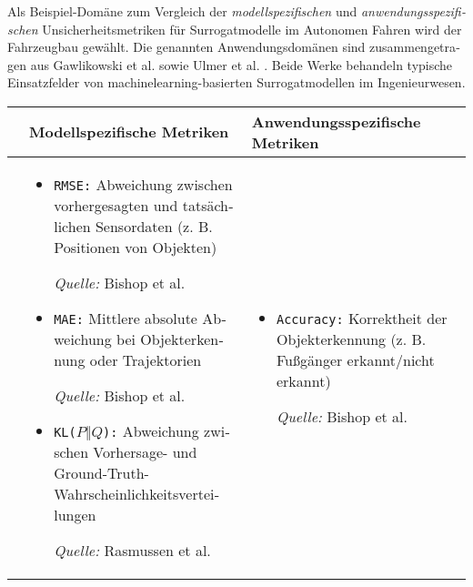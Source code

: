 \begin{otherlanguage}{ngerman}
Als Beispiel-Domäne zum Vergleich der \textit{modellspezifischen} und \textit{anwendungsspezifischen} Unsicherheitsmetriken für Surrogatmodelle im Autonomen Fahren wird der Fahrzeugbau gewählt. Die genannten Anwendungsdomänen sind zusammengetragen aus Gawlikowski et al. \parencite{Gawlikowski2023} sowie Ulmer et al. \parencite{Ulmer2023}. Beide Werke behandeln typische Einsatzfelder von \gls{machinelearning}-basierten Surrogatmodellen im Ingenieurwesen.

\begin{table}[!htpb]
	\centering
	\footnotesize
	\begin{tabularx}{\textwidth}{|>{\centering\arraybackslash}l|X|X|}
		\hline
		& \hspace{0.6em}\textbf{Modellspezifische Metriken} 
		& \hspace{0.6em}\textbf{Anwendungsspezifische Metriken} \\
		\hline
		
		\multirow{14}{*}{\textbf{\gls{Aleatorische Unsicherheit}}} &
		
		\begin{itemize}[topsep=0em, itemsep=0.125em, leftmargin=*, label={}]
			\item \texttt{RMSE:} Abweichung zwischen vorhergesagten und tatsächlichen Sensordaten (z. B. Positionen von Objekten) \par
			\begin{scriptsize}\textit{Quelle:} Bishop et al. \parencite[S.~224–226]{bishop2006pattern}\end{scriptsize}
			
			\item \texttt{MAE:} Mittlere absolute Abweichung bei Objekterkennung oder Trajektorien \par
			\begin{scriptsize}\textit{Quelle:} Bishop et al. \parencite[S.~224–226]{bishop2006pattern}\end{scriptsize}
			
			\item \texttt{KL($P\Vert Q$):} Abweichung zwischen Vorhersage- und Ground-Truth-Wahrscheinlichkeitsverteilungen \par
			\begin{scriptsize}\textit{Quelle:} Rasmussen et al. \parencite[Kap.~2]{rasmussen2006gaussian}\end{scriptsize}
		\end{itemize}
		&
		
		\begin{itemize}[topsep=0em, itemsep=0.125em, leftmargin=*, label={}]
			\item \texttt{Accuracy:} Korrektheit der Objekterkennung (z. B. Fußgänger erkannt/nicht erkannt) \par
			\begin{scriptsize}\textit{Quelle:} Bishop et al. \parencite[S.~40–42]{bishop2006pattern}\end{scriptsize}
			

\end{itemize}
\end{tabularx}
\end{table}
\end{otherlanguage}
